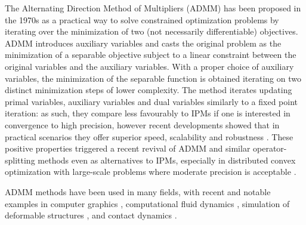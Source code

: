 \documentclass[AMA,STIX1COL]{WileyNJD-v2}
\begin{document}
The Alternating Direction Method of Multipliers (ADMM) has been proposed in the 1970s 
\cite{Glowinski75} %
\cite{Gabay1976} %
as a practical way to solve constrained optimization problems by iterating over the minimization of two (not necessarily differentiable) objectives.
ADMM introduces auxiliary variables and casts the original problem as the minimization of a separable objective subject to a linear constraint between the original variables and the auxiliary variables. With a proper choice of auxiliary variables, the minimization of the separable function is obtained iterating on two distinct minimization steps of lower complexity. The method iterates updating primal variables, auxiliary variables and dual variables similarly to a fixed point iteration: as such, they compare less favourably to IPMs if one is interested in convergence to high precision, however recent developments showed that in practical scenarios they offer superior speed, scalability and robustness
 \cite{Boyd2011}. %
These positive properties triggered a recent revival of ADMM and similar operator-splitting methods even as alternatives to IPMs, especially in distributed convex optimization with large-scale problems where moderate precision is acceptable
\cite{Cannon2019}. %

ADMM methods have been used in many fields, with recent and notable examples in computer graphics 
 \cite{Zhang2019},
computational fluid dynamics
 \cite{Gregson2014}, %
simulation of deformable structures 
 \cite{Overby2017}, %
and contact dynamics 
 \cite{Daviet2020,LeLidec2020}. %
\end{document}
